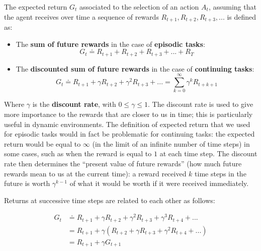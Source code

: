 The expected return $G_t$ associated to the selection of an action $A_t$, assuming that the agent receives over time a sequence of rewards $R_{t+1}, R_{t+2}, R_{t+3}, ...$ is defined as:

\begin{itemize}
    \item The \textbf{sum of future rewards} in the case of \textbf{episodic tasks}:
    \begin{equation}
        G_t \doteq R_{t+1} + R_{t+2} + R_{t+3} + ... + R_T
        \label{eq:ch2-expectedreturn-episodic}
    \end{equation}
    \item The \textbf{discounted sum of future rewards} in the case of \textbf{continuing tasks}:
    \begin{equation}
        G_t \doteq R_{t+1} + \gamma R_{t+2} + \gamma^2 R_{t+3} + ... = \sum_{k=0}^{\infty} \gamma^k R_{t+k+1}
        \label{eq:ch2-expectedreturn-continuous}
    \end{equation}
\end{itemize}

Where $\gamma$ is the \textbf{discount rate}, with $0 \le \gamma \le 1$. The discount rate is used to give more importance to the rewards that are closer to us in time; this is particularly useful in dynamic environments. The definition of expected return that we used for episodic tasks would in fact be problematic for continuing tasks: the expected return would be equal to $\infty$ (in the limit of an infinite number of time steps) in some cases, such as when the reward is equal to $1$ at each time step. The discount rate then determines the ``present value of future rewards'' (how much future rewards mean to us at the current time): a reward received $k$ time steps in the future is worth $\gamma^{k-1}$ of what it would be worth if it were received immediately.

Returns at successive time steps are related to each other as follows:

\begin{equation*}
    \begin{split}
        G_t & \doteq R_{t+1} + \gamma R_{t+2} + \gamma^2 R_{t+3} + \gamma^3 R_{t+4} + ... \\
        & = R_{t+1} + \gamma \left( R_{t+2} + \gamma R_{t+3} + \gamma^2 R_{t+4} + ... \right) \\
        & = R_{t+1} + \gamma G_{t+1} \\
    \end{split}
\end{equation*}

